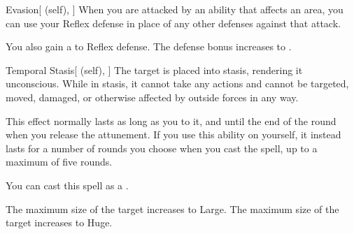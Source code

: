 \lowercase{\hypertarget{spell:Evasion}{}}\label{spell:Evasion}
\begin{attuneability}[Rank 4]{\hypertarget{spell:Evasion}{Evasion}}[ (self), ]
When you are attacked by an ability that affects an area, you can use your Reflex defense in place of any other defenses against that attack.

\rankline
{} You also gain a   to Reflex defense.
 The defense bonus increases to .
\end{attuneability}
\vspace{0.25em}



\lowercase{\hypertarget{spell:Temporal Stasis}{}}\label{spell:Temporal Stasis}
\begin{attuneability}[Rank 4]{\hypertarget{spell:Temporal Stasis}{Temporal Stasis}}[ (self), ]
The target is placed into stasis, rendering it unconscious.
While in stasis, it cannot take any actions and cannot be targeted, moved, damaged, or otherwise affected by outside forces in any way.

This effect normally lasts as long as you  to it, and until the end of the round when you release the attunement.
If you use this ability on yourself, it instead lasts for a number of rounds you choose when you cast the spell, up to a maximum of five rounds.

You can cast this spell as a .

\rankline
{} The maximum size of the target increases to Large.
 The maximum size of the target increases to Huge.
\end{attuneability}
\vspace{0.25em}



